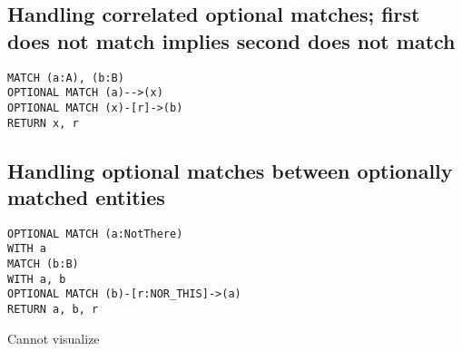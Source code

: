 \subsection{Handling correlated optional matches; first does not match implies second does not match}

\begin{lstlisting}
MATCH (a:A), (b:B)
OPTIONAL MATCH (a)-->(x)
OPTIONAL MATCH (x)-[r]->(b)
RETURN x, r
\end{lstlisting}

\subsection{Handling optional matches between optionally matched entities}

\begin{lstlisting}
OPTIONAL MATCH (a:NotThere)
WITH a
MATCH (b:B)
WITH a, b
OPTIONAL MATCH (b)-[r:NOR_THIS]->(a)
RETURN a, b, r
\end{lstlisting}

Cannot visualize
